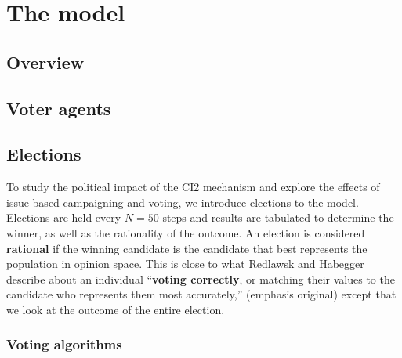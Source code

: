 \section{The model}
\label{sec:model}

\subsection{Overview}


\subsection{Voter agents}


\subsection{Elections}


To study the political impact of the CI2 mechanism and explore the effects of
issue-based campaigning and voting, we introduce elections to the model.
Elections are held every $N=50$ steps and results
are tabulated to determine the winner, as well as the rationality of the
outcome. An election is considered \textbf{rational} if the winning candidate
is the candidate that best represents the population in opinion space. This is
close to what Redlawsk and Habegger describe about an individual
``\textbf{voting correctly}, or matching their values to the candidate who
represents them most accurately,''\cite[p.8]{redlawsk_citizens_2020} (emphasis
original) except that we look at the outcome of the entire election. 

\subsubsection{Voting algorithms}


